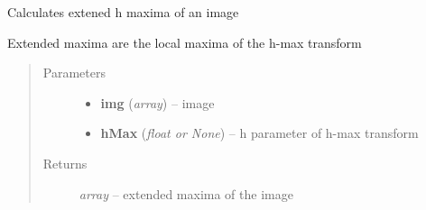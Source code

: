 \documentclass[letterpaper,10pt,english]{sphinxmanual}
\begin{document}

\begin{fulllineitems}
\label{api/ClearMap.ImageProcessing:ClearMap.ImageProcessing.MaximaDetection.extendedMax}
Calculates extened h maxima of an image

Extended maxima are the local maxima of the h-max transform
\begin{quote}\begin{description}
\item[{Parameters}] \leavevmode\begin{itemize}
\item {} 
\textbf{img} (\emph{array}) --
image

\item {} 
\textbf{hMax} (\emph{float or None}) --
h parameter of h-max transform

\end{itemize}

\item[{Returns}] \leavevmode
\emph{array} --
extended maxima of the image

\end{description}\end{quote}

\end{fulllineitems}

\end{document}
